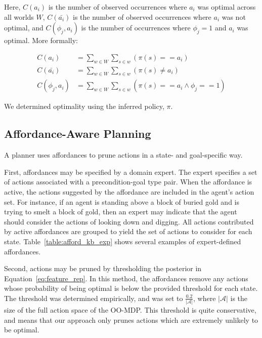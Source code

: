 \documentclass[letterpaper]{article}
\begin{document}
Here, $C(a_i)$ is the number of observed occurrences where $a_i$ was optimal across all worlds $W$,
$C(\bar{a_i})$ is the number of observed occurrences where $a_i$ was not optimal,
and $C(\phi_j, a_i)$ is the number of occurrences where $\phi_j=1$ and $a_i$ was optimal. More formally:

\begin{align}
C(a_i) &= \sum_{w \in W} \sum_{s \in w} (\pi(s) == a_i) \\
C(\bar{a_i}) &= \sum_{w \in W} \sum_{s \in w} (\pi(s) \not= a_i) \\
C(\phi_j, a_i) &= \sum_{w \in W} \sum_{s \in w} (\pi(s) == a_i \wedge \phi_j == 1)
\end{align}

\noindent We determined optimality using the inferred policy, $\pi$.

\subsection{Affordance-Aware Planning}
\label{sec:action_pruning}
A planner uses affordances to prune actions in a state- and
goal-specific way.

First, affordances may be specified by a domain expert.  The expert
specifies a set of actions associated with a precondition-goal type
pair. When the affordance is active, the actions suggested by the
affordance are included in the agent's action set. For instance, if an
agent is standing above a block of buried gold and is trying to smelt
a block of gold, then an expert may indicate that the agent should
consider the actions of looking down and digging.  All actions
contributed by active affordances are grouped to yield the set of
actions to consider for each state. Table~\ref{table:afford_kb_exp}
shows several examples of expert-defined affordances.

Second, actions may be pruned by thresholding the posterior in
Equation~\ref{eq:feature_rep}.  In this method, the affordances remove
any actions whose probability of being optimal is below the provided
threshold for each state. The threshold was determined empirically,
and was set to $\frac{0.2}{|\mathcal{A}|}$, where $|\mathcal{A}|$ is
the size of the full action space of the OO-MDP.  This threshold is
quite conservative, and means that our approach only prunes actions
which are extremely unlikely to be optimal.

\end{document}
